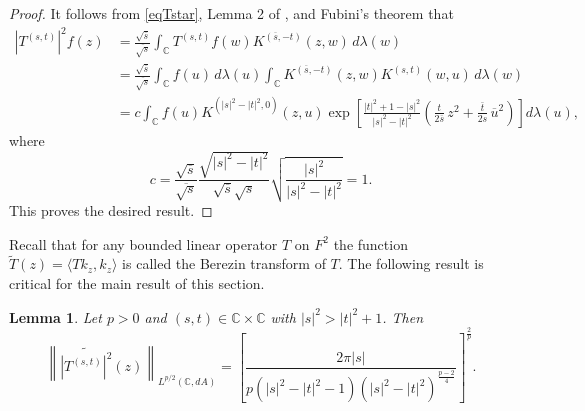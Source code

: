 \documentclass[reqno]{amsart}
\newtheorem{lemma}[theorem]{Lemma}
\newcommand{\C}{{\mathbb C}}
\newcommand{\inc}{\int_{\C}}
\begin{document}
\begin{proof}
It follows from \eqref{eqTstar}, Lemma 2 of \cite{DZ3},
and Fubini's theorem that
\begin{align*}
\left|T^{(s,t)}\right|^2f(z)
&=\frac{\sqrt{\overline{s}}}{\overline{\sqrt{s}}}
\inc T^{(s,t)}f(w) K^{(\overline{s},-t)}(z,w)\,d\lambda(w)\\
&=\frac{\sqrt{\overline{s}}}{\overline{\sqrt{s}}}\inc f(u)\,d\lambda(u)
\inc{K^{(\overline{s},-t)}(z,w)}{K^{({s},t)}(w,u)}\,d\lambda(w)\\
&=c\inc f(u)K^{(|s|^2-|t|^2,0)}(z,u)\exp\left[%
\frac{|t|^2+1-|s|^2}{|s|^2-|t|^2}\left(\frac{t}{2\overline{s}}\,z^2
+\frac{\bar t}{2s}
\,\overline u^2\right)\right] d\lambda(u),
\end{align*}
where
$$c=\frac{\sqrt{\overline{s}}}{\overline{\sqrt{s}}}
\frac{\sqrt{|s|^2-|t|^2}}{\sqrt{\overline{s}}\sqrt{s}}
\sqrt{\frac{|s|^2}{|s|^2-|t|^2}}=1.$$
This proves the desired result.
\end{proof}

Recall that for any bounded linear operator $T$ on $F^2$ the function
$\widetilde T(z)=\langle Tk_z, k_z\rangle$ is called the Berezin transform
of $T$. The following result is critical for the main result of this section.

\begin{lemma}\label{lemsp}
Let $p>0$ and $(s, t)\in\C\times\C$ with $|s|^2>|t|^2+1$. Then
\begin{equation}\label{eqsp}
\left\|\widetilde{\left|T^{(s,t)}\right|^2}(z)
\right\|_{L^{{p}/{2}}(\mathbb{C},dA)}=
\left[\frac{2\pi|s|}{p(|s|^2-|t|^2-1)(|s|^2-|t|^2)^\frac{p-2}{4}}
\right]^{\frac{2}{p}}.
\end{equation}
\end{lemma}
\end{document}
